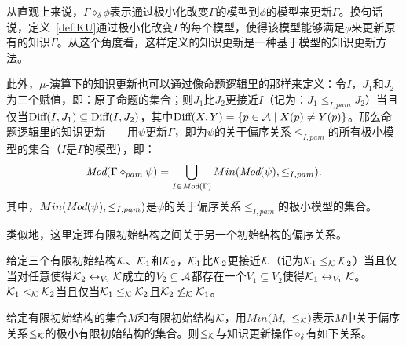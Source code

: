 从直观上来说，$\Gamma \diamond_{\delta} \phi$表示通过极小化改变$\Gamma$的模型到$\phi$的模型来更新$\Gamma$。换句话说，定义~\ref{def:KU}通过极小化改变$\Gamma$的每个模型，使得该模型能够满足$\phi$来更新原有的知识$\Gamma$。从这个角度看，这样定义的知识更新是一种基于模型的知识更新方法。

此外，$\mu$-演算下的知识更新也可以通过像命题逻辑里的那样来定义：令$I$，$J_1$和$J_2$为三个赋值，即：原子命题的集合；则$J_1$比$J_2$更接近$I$（记为：$J_1 \leq_{I,pam} J_2$）当且仅当$\textrm{Diff}(I, J_1) \subseteq \textrm{Diff}(I, J_2)$，其中$\textrm{Diff}(X, Y) =\{p\in {\cal A} \mid X(p) \not = Y(p)\}$。那么命题逻辑里的知识更新——用$\psi$更新$\Gamma$，即为$\psi$的关于偏序关系$\leq_{I,pam}$的所有极小模型的集合（$I$是$\Gamma$的模型），即：
$$\textit{Mod}(\Gamma \diamond_{pam} \psi) = \bigcup_{I \in \textit{Mod}(\Gamma)} Min(\textit{Mod}(\psi), \leq_{I,pam}).$$
其中，$Min(\textit{Mod}(\psi), \leq_{I,pam})$是$\psi$的关于偏序关系$\leq_{I,pam}$的极小模型的集合。

类似地，这里定理有限初始结构之间关于另一个初始结构的偏序关系。
\begin{definition}\label{def:closer}
	给定三个有限初始结构${\cal K}$、${\cal K}_1$和${\cal K}_2$，${\cal K}_1$比${\cal K}_2$更接近${\cal K}$（记为${\cal K}_1 \leq_{{\cal K}} {\cal K}_2$）当且仅当对任意使得${\cal K}_2 \leftrightarrow_{V_2} {\cal K}$成立的$V_2 \subseteq \mathcal{A}$都存在一个$V_1 \subseteq V_2$使得${\cal K}_1 \leftrightarrow_{V_1} {\cal K}$。
	 ${\cal K}_1 <_{{\cal K}} {\cal K}_2$当且仅当${\cal K}_1 \leq_{{\cal K}} {\cal K}_2$且${\cal K}_2 \not \leq_{{\cal K}} {\cal K}_1$。
\end{definition}

给定有限初始结构的集合$M$和有限初始结构${\cal K}$，用$Min(M,$ $\leq_{{\cal K}})$表示$M$中关于偏序关系$\leq_{{\cal K}}$的极小有限初始结构的集合。则$\leq_{{\cal K}}$与知识更新操作$\diamond_{\delta}$有如下关系。

